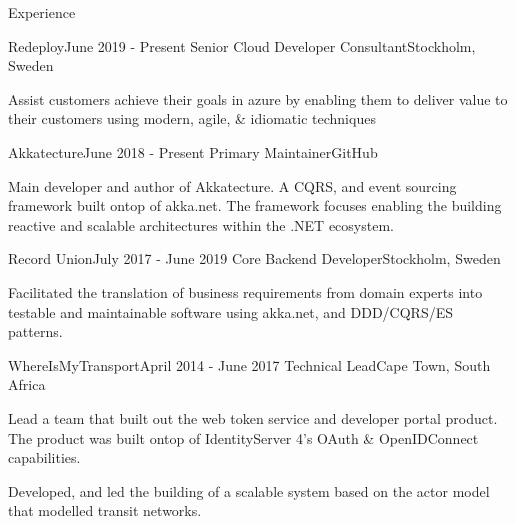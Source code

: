 \documentclass{resume} %
\begin{document}
    \begin{rSection}{Experience}

        \begin{rSubsection}
            {Redeploy}{June 2019 - Present}
            {Senior Cloud Developer Consultant}{Stockholm, Sweden}
            
            \item Assist customers achieve their goals in azure by enabling them to deliver
                value to their customers using modern, agile, \& idiomatic techniques
                
        \end{rSubsection}

        \begin{rSubsection}
            {Akkatecture}{June 2018 - Present}
            {Primary Maintainer}{GitHub}
            
            \item Main developer and author of Akkatecture. A CQRS, and event sourcing
                framework built ontop of akka.net. The framework focuses enabling the
                building reactive and scalable architectures within the .NET ecosystem.
                
        \end{rSubsection}

        \begin{rSubsection}
            {Record Union}{July 2017 - June 2019}
            {Core Backend Developer}{Stockholm, Sweden}
            
            \item Facilitated the translation of business requirements from domain
                experts into testable and maintainable software using akka.net,
                and DDD/CQRS/ES patterns.
                
        \end{rSubsection}

        \begin{rSubsection}
            {WhereIsMyTransport}{April 2014 - June 2017}
            {Technical Lead}{Cape Town, South Africa}
            
            \item Lead a team that built out the web token service and developer portal product.
                The product was built ontop of IdentityServer 4's OAuth \& OpenIDConnect capabilities.
            
            \item Developed, and led the building of a scalable system based on the actor model that modelled transit
            networks.
                

\end{rSubsection}
\end{rSection}
\end{document}
